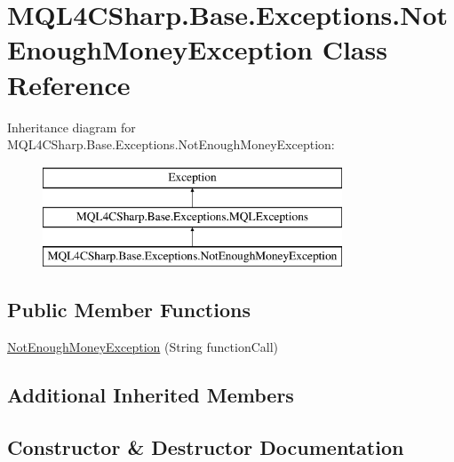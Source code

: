 \hypertarget{class_m_q_l4_c_sharp_1_1_base_1_1_exceptions_1_1_not_enough_money_exception}{}\section{M\+Q\+L4\+C\+Sharp.\+Base.\+Exceptions.\+Not\+Enough\+Money\+Exception Class Reference}
\label{class_m_q_l4_c_sharp_1_1_base_1_1_exceptions_1_1_not_enough_money_exception}
Inheritance diagram for M\+Q\+L4\+C\+Sharp.\+Base.\+Exceptions.\+Not\+Enough\+Money\+Exception\+:\begin{figure}[H]
\begin{center}
\leavevmode
\includegraphics[height=3.000000cm]{class_m_q_l4_c_sharp_1_1_base_1_1_exceptions_1_1_not_enough_money_exception}
\end{center}
\end{figure}
\subsection*{Public Member Functions}
\begin{DoxyCompactItemize}
\item 
\hyperlink{class_m_q_l4_c_sharp_1_1_base_1_1_exceptions_1_1_not_enough_money_exception_ad272e2951f9e29ac3c7d40edd6e349b5}{Not\+Enough\+Money\+Exception} (String function\+Call)
\end{DoxyCompactItemize}
\subsection*{Additional Inherited Members}


\subsection{Constructor \& Destructor Documentation}
